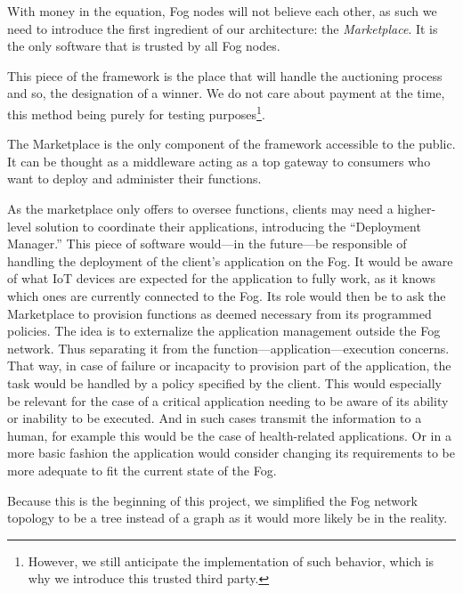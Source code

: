 With money in the equation, Fog nodes will not believe each other, as such we need to introduce the first ingredient of our architecture: the \emph{Marketplace}. It is the only software that is trusted by all Fog nodes.

This piece of the framework is the place that will handle the auctioning process and so, the designation of a winner. We do not care about payment at the time, this method being purely for testing purposes\footnote{However, we still anticipate the implementation of such behavior, which is why we introduce this trusted third party.}.

The Marketplace is the only component of the framework accessible to the public. It can be thought as a middleware acting as a top gateway to consumers who want to deploy and administer their functions.

As the marketplace only offers to oversee functions, clients may need a higher-level solution to coordinate their applications, introducing the “Deployment Manager.” This piece of software would—in the future—be responsible of handling the deployment of the client's application on the Fog. It would be aware of what \gls{IoT} devices are expected for the application to fully work, as it knows which ones are currently connected to the Fog. Its role would then be to ask the Marketplace to provision functions as deemed necessary from its programmed policies. The idea is to externalize the application management outside the Fog network. Thus separating it from the function—application—execution concerns. That way, in case of failure or incapacity to provision part of the application, the task would be handled by a policy specified by the client. This would especially be relevant for the case of a critical application needing to be aware of its ability or inability to be executed. And in such cases transmit the information to a human, for example this would be the case of health-related applications. Or in a more basic fashion the application would consider changing its requirements to be more adequate to fit the current state of the Fog.

Because this is the beginning of this project, we simplified the Fog network topology to be a tree instead of a graph as it would more likely be in the reality.

